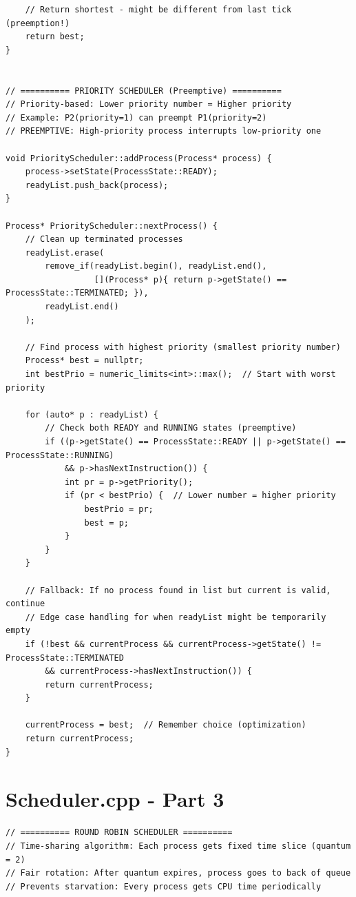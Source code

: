 \documentclass[a4paper,10pt,oneside]{article}
\begin{document}
\begin{multicols*}{\COLS}
\begin{lstlisting}
    // Return shortest - might be different from last tick (preemption!)
    return best;
}


// ========== PRIORITY SCHEDULER (Preemptive) ==========
// Priority-based: Lower priority number = Higher priority
// Example: P2(priority=1) can preempt P1(priority=2)
// PREEMPTIVE: High-priority process interrupts low-priority one

void PriorityScheduler::addProcess(Process* process) {
    process->setState(ProcessState::READY);
    readyList.push_back(process);
}

Process* PriorityScheduler::nextProcess() {
    // Clean up terminated processes
    readyList.erase(
        remove_if(readyList.begin(), readyList.end(),
                  [](Process* p){ return p->getState() == ProcessState::TERMINATED; }),
        readyList.end()
    );

    // Find process with highest priority (smallest priority number)
    Process* best = nullptr;
    int bestPrio = numeric_limits<int>::max();  // Start with worst priority
    
    for (auto* p : readyList) {
        // Check both READY and RUNNING states (preemptive)
        if ((p->getState() == ProcessState::READY || p->getState() == ProcessState::RUNNING) 
            && p->hasNextInstruction()) {
            int pr = p->getPriority();
            if (pr < bestPrio) {  // Lower number = higher priority
                bestPrio = pr;
                best = p;
            }
        }
    }

    // Fallback: If no process found in list but current is valid, continue
    // Edge case handling for when readyList might be temporarily empty
    if (!best && currentProcess && currentProcess->getState() != ProcessState::TERMINATED 
        && currentProcess->hasNextInstruction()) {
        return currentProcess;
    }

    currentProcess = best;  // Remember choice (optimization)
    return currentProcess;
}
\end{lstlisting}

\section*{Scheduler.cpp - Part 3}
\begin{lstlisting}
// ========== ROUND ROBIN SCHEDULER ==========
// Time-sharing algorithm: Each process gets fixed time slice (quantum = 2)
// Fair rotation: After quantum expires, process goes to back of queue
// Prevents starvation: Every process gets CPU time periodically


\end{lstlisting}
\end{multicols*}
\end{document}
